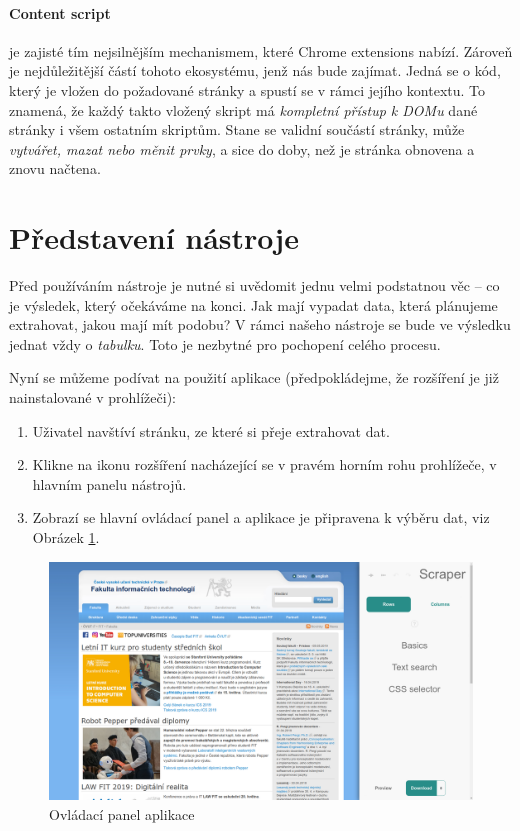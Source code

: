 \documentclass[thesis=B,czech]{FITthesis}[2012/06/26]
\begin{document}
\paragraph{Content script}\label{def:content_script} je zajisté tím nejsilnějším mechanismem, které Chrome extensions nabízí. Zároveň je nejdůležitější částí tohoto ekosystému, jenž nás bude zajímat. Jedná se o kód, který je vložen do požadované stránky a spustí se v rámci jejího kontextu. To znamená, že každý takto vložený skript má \emph{kompletní přístup k DOMu} dané stránky i všem ostatním skriptům. Stane se validní součástí stránky, může \emph{vytvářet, mazat nebo měnit prvky}, a sice do doby, než je stránka obnovena a znovu načtena.

\section{Představení nástroje}
Před používáním nástroje je nutné si uvědomit jednu velmi podstatnou věc -- co je výsledek, který očekáváme na konci. Jak mají vypadat data, která plánujeme extrahovat, jakou mají mít podobu? V rámci našeho nástroje se bude ve výsledku jednat vždy o \emph{tabulku}. Toto je nezbytné pro pochopení celého procesu.

Nyní se můžeme podívat na použití aplikace (předpokládejme, že rozšíření je již nainstalované v prohlížeči):
\begin{enumerate}
	\item Uživatel navštíví stránku, ze které si přeje extrahovat dat.
	\item Klikne na ikonu rozšíření nacházející se v pravém horním rohu prohlížeče, v hlavním panelu nástrojů.
	\item Zobrazí se hlavní ovládací panel a aplikace je připravena k výběru dat, viz Obrázek \ref{fig:scraper_control_panel}.
\end{enumerate}
\begin{figure}[h]
	\includegraphics[width=\linewidth]{images/Scraper_control_panel.png}
	\caption{Ovládací panel aplikace}
	\label{fig:scraper_control_panel}
\end{figure}
\end{document}
